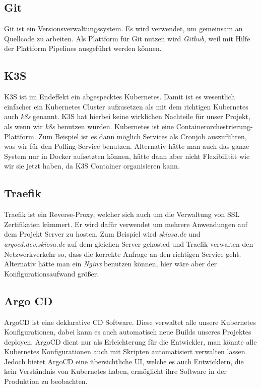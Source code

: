 \subsection{Git}
    Git ist ein Versionsverwaltungssystem. Es wird verwendet, um gemeinsam an Quellcode zu arbeiten. Als Plattform für Git nutzen wird \textit{Github},
    weil mit Hilfe der Plattform Pipelines ausgeführt werden können.
\subsection{K3S}
    K3S ist im Endeffekt ein abgespecktes Kubernetes. Damit ist es wesentlich einfacher ein Kubernetes Cluster aufzusetzen als mit dem richtigen Kubernetes auch \textit{k8s} genannt.
    K3S hat hierbei keine wirklichen Nachteile für unser Projekt, als wenn wir \textit{k8s} benutzen würden. Kubernetes ist eine Containerorchestrierung-Plattform.
    Zum Beispiel ist es dann möglich Services als Cronjob auszuführen, was wir für den Polling-Service benutzen. Alternativ hätte man auch das ganze System nur in Docker aufsetzten können, hätte dann aber 
    nicht Flexibilität wie wir sie jetzt haben, da K3S Container organisieren kann.
\subsection{Traefik}
    Traefik ist ein Reverse-Proxy, welcher sich auch um die Verwaltung von \ac{SSL} Zertifikaten kümmert. Er wird dafür verwendet um mehrere Anwendungen auf dem Projekt Server zu hosten.
    Zum Beispiel wird \textit{skiosa.de} und \textit{argocd.dev.skiosa.de} auf dem gleichen Server gehosted und Traefik verwalten den Netzwerkverkehr so, dass die korrekte Anfrage an den richtigen Service geht.
    Alternativ hätte man ein \textit{Nginx} benutzen können, hier wäre aber der Konfigurationsaufwand größer.
\subsection{Argo CD}
    ArgoCD ist eine deklarative \ac{CD} Software. Diese verwaltet alle unsere Kubernetes Konfigurationen, dabei kann es auch automatisch neue Builds unseres Projektes deployen.
    ArgoCD dient nur als Erleichterung für die Entwickler, man könnte alle Kubernetes Konfigurationen auch mit Skripten automatisiert verwalten lassen. Jedoch bietet ArgoCD eine übersichtliche UI,
    welche es auch Entwicklern, die kein Verständnis von Kubernetes haben, ermöglicht ihre Software in der Produktion zu beobachten.
